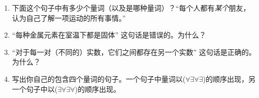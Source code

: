 \begin{enumerate}

    \item 
    
    下面这个句子中有多少个量词（以及是哪种量词）？“每个人都有\emph{某个}朋友，认为自己了解一项运动的所有事情。”
      
    \wbvfill
    
    
    \item 
    
    “每种金属元素在室温下都是固体” 这句话是错误的。为什么？
    
    \wbvfill
    
    
    \item 
    “对于每一对（不同的）实数，它们之间都存在另一个实数” 这句话是正确的。为什么？
    
    \wbvfill
    
    
    \item 
    
    写出你自己的包含四个量词的句子。一个句子中量词以($\forall \exists \forall \exists$)的顺序出现，另一个句子中以($\exists \forall \exists \forall$)的顺序出现。
    \wbvfill
    
    
    \end{enumerate}
